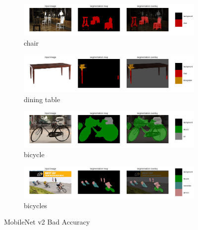 \documentclass{article}
\begin{document}
\begin{figure}[h!]
\begin{subfigure}[b]{1.0\textwidth}
\includegraphics[width=\linewidth]{chair.png}
\caption{chair}
\end{subfigure}
\begin{subfigure}[b]{1.0\textwidth}
\includegraphics[width=\linewidth]{dining_table2.png}
\caption{dining table}
\end{subfigure}
\begin{subfigure}[b]{1.0\textwidth}
\includegraphics[width=\linewidth]{bicycle1.png}
\caption{bicycle}
\end{subfigure}
\begin{subfigure}[b]{1.0\textwidth}
\includegraphics[width=\linewidth]{bicycle2.png}
\caption{bicycles}
\end{subfigure}
\caption{MobileNet v2 Bad Accuracy}
\end{figure}
\end{document}
